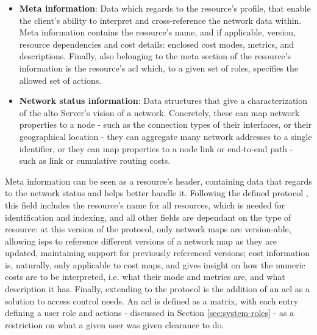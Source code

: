 
\begin{itemize}
        \item \textbf{Meta information}: Data which regards to the resource's profile, that enable the client's ability to interpret and cross-reference the network data within.
            Meta information contains the resource's name, and if applicable, version, resource dependencies and cost details: enclosed cost modes, metrics, and descriptions.
            Finally, also belonging to the meta section of the resource's information is the resource's \gls{acl} which, to a given set of roles, specifies the allowed set of actions.

        \item \textbf{Network status information}: Data structures that give a characterization of the \gls{alto} Server's vision of a network.
            Concretely, these can map network properties to a node - such as the connection types of their interfaces, or their geographical location - they can aggregate many network addresses to a single identifier, or they can map properties to a node link or end-to-end path - such as link or cumulative routing costs.
\end{itemize}

    Meta information can be seen as a resource's header, containing data that regards to the network status and helps better handle it.
    Following the defined protocol \cite{alto-protocol}, this field includes the resource's name for all resources, which is needed for identification and indexing, and all other fields are dependant on the type of resource: at this version of the protocol, only network maps are version-able, allowing \glspl{isp} to reference different versions of a network map as they are updated, maintaining support for previously referenced versions; cost information is, naturally, only applicable to cost maps, and gives insight on how the numeric costs are to be interpreted, i.e. what their mode and metrics are, and what description it has.
    Finally, extending to the protocol is the addition of an \gls{acl} as a solution to access control needs.
    An \gls{acl} is defined as a matrix, with each entry defining a user role and actions - discussed in Section \ref{sec:system-roles} - as a restriction on what a given user was given clearance to do.

